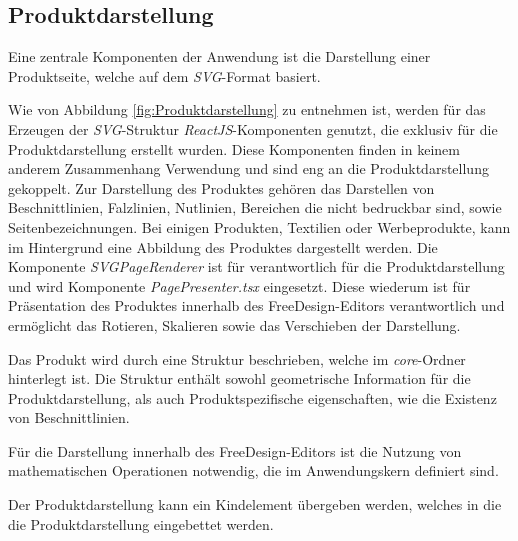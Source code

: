\subsection{Produktdarstellung}
Eine zentrale Komponenten der Anwendung ist die Darstellung einer Produktseite, welche auf dem \emph{SVG}-Format basiert.

Wie von Abbildung \ref{fig:Produktdarstellung} zu entnehmen ist, werden für das Erzeugen der \emph{SVG}-Struktur \emph{ReactJS}-Komponenten genutzt, die exklusiv für die Produktdarstellung erstellt wurden. Diese Komponenten finden in keinem anderem Zusammenhang Verwendung und sind eng an die Produktdarstellung gekoppelt. 
Zur Darstellung des Produktes gehören das Darstellen von Beschnittlinien, Falzlinien, Nutlinien, Bereichen die nicht bedruckbar sind, sowie Seitenbezeichnungen. Bei einigen Produkten, Textilien oder Werbeprodukte, kann im Hintergrund eine Abbildung des Produktes dargestellt werden. Die Komponente \emph{SVGPageRenderer} ist für verantwortlich für die Produktdarstellung und wird Komponente \emph{PagePresenter.tsx} eingesetzt. Diese wiederum ist für Präsentation des Produktes innerhalb des FreeDesign-Editors verantwortlich und ermöglicht das Rotieren, Skalieren sowie das Verschieben der Darstellung. 


Das Produkt wird durch eine Struktur beschrieben, welche im \emph{core}-Ordner hinterlegt ist. Die Struktur enthält sowohl geometrische Information für die Produktdarstellung, als auch Produktspezifische eigenschaften, wie die Existenz von Beschnittlinien. 

Für die Darstellung innerhalb des FreeDesign-Editors ist die Nutzung von mathematischen Operationen notwendig, die im Anwendungskern definiert sind. 

Der Produktdarstellung kann ein Kindelement übergeben werden, welches in die die Produktdarstellung eingebettet werden. 




